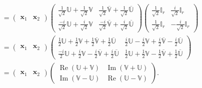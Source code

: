 \documentclass[aps, preprint]{revtex4}
\begin{document}
\begin{align} &  =\left (\begin{array}{cc}\mathbf{x}_{1} & \mathbf{x}_{2}\end{array}\right ) \left (\begin{array}{cc}\frac{1}{\sqrt{2}} \mathbb{U} +\frac{1}{\sqrt{2}} \mathbb{V} & \frac{1}{\sqrt{2}} \overline{\mathbb{V}} +\frac{1}{\sqrt{2}} \overline{\mathbb{U}} \\
\frac{ -i}{\sqrt{2}} \mathbb{U} +\frac{i}{\sqrt{2}} \mathbb{V} & \frac{ -i}{\sqrt{2}} \overline{\mathbb{V}} +\frac{i}{\sqrt{2}} \overline{\mathbb{U}}\end{array}\right ) \left (\begin{array}{cc}\frac{1}{\sqrt{2}} \mathbb{I}_{r} & \frac{i}{\sqrt{2}} \mathbb{I}_{r} \\
\frac{1}{\sqrt{2}} \mathbb{I}_{r} &  -\frac{i}{\sqrt{2}} \mathbb{I}_{r}\end{array}\right ) \nonumber  \\
 &  =\left (\begin{array}{cc}\mathbf{x}_{1} & \mathbf{x}_{2}\end{array}\right ) \left (\begin{array}{cc}\frac{1}{2} \mathbb{U} +\frac{1}{2} \mathbb{V} +\frac{1}{2} \overline{\mathbb{V}} +\frac{1}{2} \overline{\mathbb{U}} & \frac{i}{2} \mathbb{U} -\frac{i}{2} \mathbb{V} +\frac{i}{2} \overline{\mathbb{V}} -\frac{i}{2} \overline{\mathbb{U}} \\
\frac{ -i}{2} \mathbb{U} +\frac{i}{2} \mathbb{V} -\frac{i}{2} \overline{\mathbb{V}} +\frac{i}{2} \overline{\mathbb{U}} & \frac{1}{2} \mathbb{U} +\frac{1}{2} \mathbb{V} -\frac{1}{2} \overline{\mathbb{V}} +\frac{1}{2} \overline{\mathbb{U}}\end{array}\right ) \nonumber  \\
 &  =\left (\begin{array}{cc}\mathbf{x}_{1} & \mathbf{x}_{2}\end{array}\right ) \left (\begin{array}{cc}\ensuremath{\operatorname*{Re}} \left (\mathbb{U} +\mathbb{V}\right ) & \ensuremath{\operatorname*{Im}} \left (\mathbb{V} +\mathbb{U}\right ) \\
\ensuremath{\operatorname*{Im}} \left (\mathbb{V} -\mathbb{U}\right ) & \ensuremath{\operatorname*{Re}} \left (\mathbb{U} -\mathbb{V}\right )\end{array}\right )\text{.}\end{align}
\end{document}
